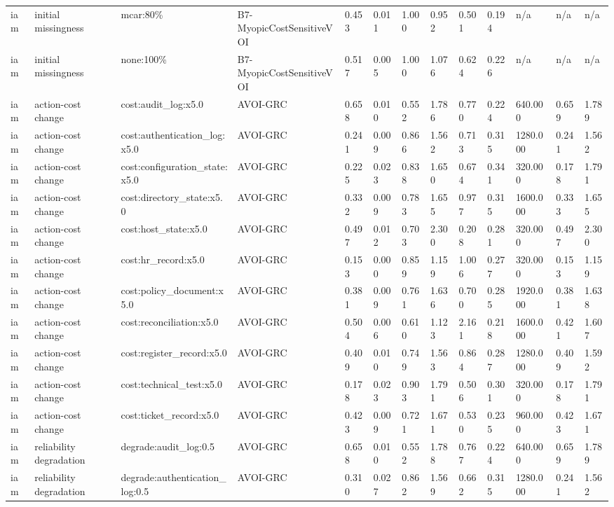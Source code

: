 \begin{table}[!ht]
{\begin{tabular}{lllllllllllll}
iam & initial missingness & mcar:80\% & B7-MyopicCostSensitiveVOI & 0.453 & 0.011 & 1.000 & 0.952 & 0.501 & 0.194 & n/a & n/a & n/a \\
iam & initial missingness & none:100\% & B7-MyopicCostSensitiveVOI & 0.517 & 0.005 & 1.000 & 1.076 & 0.624 & 0.226 & n/a & n/a & n/a \\
iam & action-cost change & cost:audit\_log:x5.0 & AVOI-GRC & 0.658 & 0.010 & 0.552 & 1.786 & 0.770 & 0.224 & 640.000 & 0.659 & 1.789 \\
iam & action-cost change & cost:authentication\_log:x5.0 & AVOI-GRC & 0.241 & 0.009 & 0.866 & 1.562 & 0.713 & 0.315 & 1280.000 & 0.241 & 1.562 \\
iam & action-cost change & cost:configuration\_state:x5.0 & AVOI-GRC & 0.225 & 0.023 & 0.838 & 1.650 & 0.674 & 0.341 & 320.000 & 0.178 & 1.791 \\
iam & action-cost change & cost:directory\_state:x5.0 & AVOI-GRC & 0.332 & 0.009 & 0.783 & 1.655 & 0.977 & 0.315 & 1600.000 & 0.333 & 1.655 \\
iam & action-cost change & cost:host\_state:x5.0 & AVOI-GRC & 0.497 & 0.012 & 0.703 & 2.300 & 0.208 & 0.281 & 320.000 & 0.497 & 2.300 \\
iam & action-cost change & cost:hr\_record:x5.0 & AVOI-GRC & 0.153 & 0.000 & 0.859 & 1.159 & 1.006 & 0.277 & 320.000 & 0.153 & 1.159 \\
iam & action-cost change & cost:policy\_document:x5.0 & AVOI-GRC & 0.381 & 0.009 & 0.761 & 1.636 & 0.700 & 0.285 & 1920.000 & 0.381 & 1.638 \\
iam & action-cost change & cost:reconciliation:x5.0 & AVOI-GRC & 0.504 & 0.006 & 0.610 & 1.123 & 2.161 & 0.218 & 1600.000 & 0.421 & 1.607 \\
iam & action-cost change & cost:register\_record:x5.0 & AVOI-GRC & 0.409 & 0.010 & 0.749 & 1.563 & 0.864 & 0.287 & 1280.000 & 0.409 & 1.592 \\
iam & action-cost change & cost:technical\_test:x5.0 & AVOI-GRC & 0.178 & 0.023 & 0.903 & 1.791 & 0.506 & 0.301 & 320.000 & 0.178 & 1.791 \\
iam & action-cost change & cost:ticket\_record:x5.0 & AVOI-GRC & 0.423 & 0.009 & 0.721 & 1.671 & 0.530 & 0.235 & 960.000 & 0.423 & 1.671 \\
iam & reliability degradation & degrade:audit\_log:0.5 & AVOI-GRC & 0.658 & 0.010 & 0.552 & 1.788 & 0.767 & 0.224 & 640.000 & 0.659 & 1.789 \\
iam & reliability degradation & degrade:authentication\_log:0.5 & AVOI-GRC & 0.310 & 0.027 & 0.862 & 1.569 & 0.662 & 0.315 & 1280.000 & 0.241 & 1.562 \\

\end{tabular}}
\end{table}
